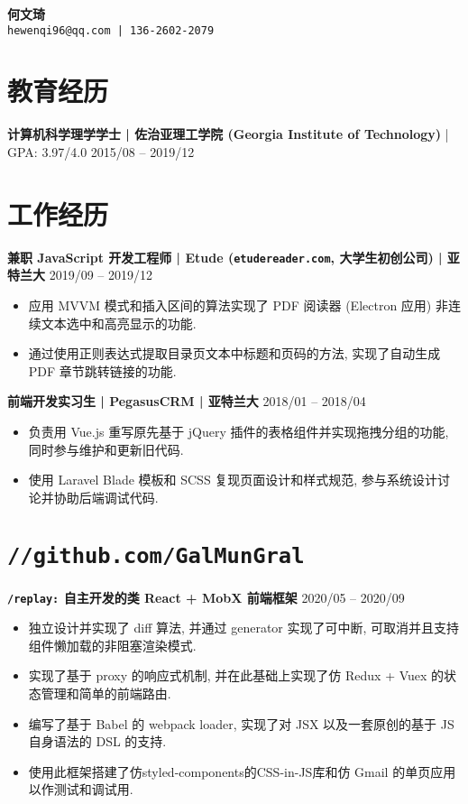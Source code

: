 \documentclass[10 pt]{article}
\begin{document}
\begin{center}
\textbf{\huge 何文琦}\\
\vspace{1em}
\texttt{hewenqi96@qq.com | 136-2602-2079 }
\end{center}

\section*{教育经历}
\textbf{计算机科学理学学士 | 佐治亚理工学院 (Georgia Institute of Technology)} | GPA: 3.97/4.0 \hfill 2015/08 -- 2019/12

\section*{工作经历}
\textbf{兼职 JavaScript 开发工程师 | Etude (\texttt{etudereader.com}, 大学生初创公司) | 亚特兰大} \hfill 2019/09 -- 2019/12
\begin{itemize}
\item 应用 MVVM 模式和插入区间的算法实现了 PDF 阅读器 (Electron 应用) 非连续文本选中和高亮显示的功能.
\item 通过使用正则表达式提取目录页文本中标题和页码的方法, 实现了自动生成 PDF 章节跳转链接的功能.
\end{itemize}

\textbf{前端开发实习生 | PegasusCRM | 亚特兰大} \hfill 2018/01 -- 2018/04
\begin{itemize}
\item 负责用 Vue.js 重写原先基于 jQuery 插件的表格组件并实现拖拽分组的功能, 同时参与维护和更新旧代码.
\item 使用 Laravel Blade 模板和 SCSS 复现页面设计和样式规范, 参与系统设计讨论并协助后端调试代码.
\end{itemize} 


\section*{\texttt{\large //github.com/GalMunGral}}
\textbf{ \texttt{/replay:} 自主开发的类 React + MobX  前端框架} \hfill 2020/05 -- 2020/09
\begin{itemize}
\item 独立设计并实现了 diff 算法, 并通过 generator 实现了可中断, 可取消并且支持组件懒加载的非阻塞渲染模式.
\item 实现了基于 proxy 的响应式机制, 并在此基础上实现了仿 Redux + Vuex 的状态管理和简单的前端路由.
\item 编写了基于 Babel 的 webpack loader, 实现了对 JSX 以及一套原创的基于 JS 自身语法的 DSL 的支持.
\item 使用此框架搭建了仿styled-components的CSS-in-JS库和仿 Gmail 的单页应用以作测试和调试用.
\end{itemize}
\end{document}
